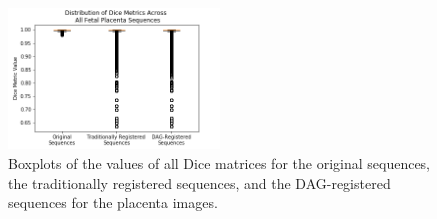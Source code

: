 \begin{figure}
\centering
\includegraphics[width=0.5\textwidth]{6/figures/fetal-placenta-dice-box.png}
\caption{Boxplots of the values of all Dice matrices for the original sequences, the traditionally registered sequences, and the DAG-registered sequences for the placenta images.}
\label{fig:fetal-placenta-dice-box}
\end{figure}


